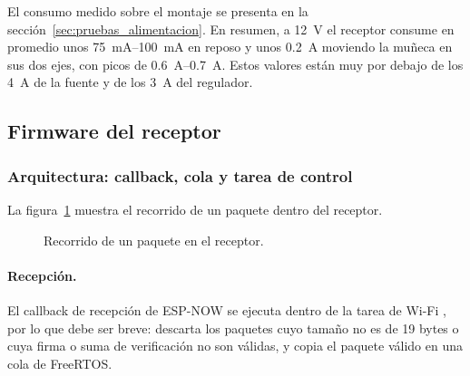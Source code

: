 El consumo medido sobre el montaje se presenta en la sección~\ref{sec:pruebas_alimentacion}. En resumen, a \SI{12}{\volt} el receptor consume en promedio unos \SIrange{75}{100}{\milli\ampere} en reposo y unos \SI{0.2}{\ampere} moviendo la muñeca en sus dos ejes, con picos de \SIrange{0.6}{0.7}{\ampere}. Estos valores están muy por debajo de los \SI{4}{\ampere} de la fuente y de los \SI{3}{\ampere} del regulador.

\subsection{Firmware del receptor}

\subsubsection{Arquitectura: callback, cola y tarea de control}

La figura~\ref{fig:arquitectura_rx} muestra el recorrido de un paquete dentro del receptor.

\begin{figure}[H]
\centering
{}
\caption{Recorrido de un paquete en el receptor.}
\label{fig:arquitectura_rx}
\end{figure}

\paragraph{Recepción.} El callback de recepción de ESP-NOW se ejecuta dentro de la tarea de Wi-Fi \cite{espnow_idf}, por lo que debe ser breve: descarta los paquetes cuyo tamaño no es de 19 bytes o cuya firma o suma de verificación no son válidas, y copia el paquete válido en una cola de FreeRTOS.

